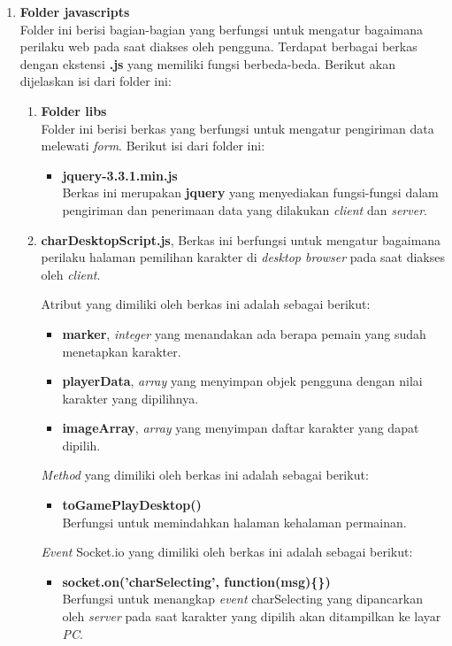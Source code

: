 \begin{enumerate}
\begin{enumerate}
		\item \textbf{Folder javascripts} \\
		Folder ini berisi bagian-bagian yang berfungsi untuk mengatur bagaimana perilaku web pada saat diakses oleh pengguna. Terdapat berbagai berkas dengan ekstensi \textbf{.js} yang memiliki fungsi berbeda-beda. Berikut akan dijelaskan isi dari folder ini:
		
		\begin{enumerate}
			\item \textbf{Folder libs} \\
			Folder ini berisi berkas yang berfungsi untuk mengatur pengiriman data melewati \textit{form}. Berikut isi dari folder ini:
			\begin{itemize}
				\item \textbf{jquery-3.3.1.min.js} \\ Berkas ini merupakan \textbf{jquery} yang menyediakan fungsi-fungsi dalam pengiriman dan penerimaan data yang dilakukan \textit{client} dan \textit{server}. 
			\end{itemize}
		
			\item \textbf{charDesktopScript.js}, Berkas ini berfungsi untuk mengatur bagaimana perilaku halaman pemilihan karakter di \textit{desktop browser} pada saat diakses oleh \textit{client}.
			
			Atribut yang dimiliki oleh berkas ini adalah sebagai berikut:
			\begin{itemize}
				\item \textbf{marker}, \textit{integer} yang menandakan ada berapa pemain yang sudah menetapkan karakter.
				\item \textbf{playerData}, \textit{array} yang menyimpan objek pengguna dengan nilai karakter yang dipilihnya.
				\item \textbf{imageArray}, \textit{array} yang menyimpan daftar karakter yang dapat dipilih.
			\end{itemize}
		
			\textit{Method} yang dimiliki oleh berkas ini adalah sebagai berikut:
			\begin{itemize}
				\item \textbf{toGamePlayDesktop()} \\
				Berfungsi untuk memindahkan halaman kehalaman permainan.
			\end{itemize}
		
			\textit{Event} Socket.io yang dimiliki oleh berkas ini adalah sebagai berikut:
			\begin{itemize}
				\item \textbf{socket.on('charSelecting', function(msg)\{\})} \\
				Berfungsi untuk menangkap \textit{event} charSelecting yang dipancarkan oleh \textit{server} pada saat karakter yang dipilih akan ditampilkan ke layar \textit{PC}.
				

\end{itemize}
\end{enumerate}
\end{enumerate}
\end{enumerate}
